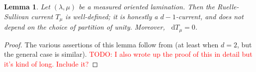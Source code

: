 \documentclass[reqno,11pt]{amsart}
\newcommand{\RR}{\mathbf{R}}
\newcommand*\dif{\mathop{}\!\mathrm{d}}
\newtheorem{lemma}[theorem]{Lemma}
\theoremstyle{definition}
\numberwithin{equation}{section}
\newcommand\todo[1]{\textcolor{red}{TODO: #1}}
\begin{document}
\begin{lemma}
Let $(\lambda, \mu)$ be a measured oriented lamination.
Then the Ruelle-Sullivan current $T_\mu$ is well-defined; it is honestly a $d-1$-current, and does not depend on the choice of partition of unity.
Moreover, $\dif T_\mu = 0$.
\end{lemma}
\begin{proof}
The various assertions of this lemma follow from \cite[Theorem 8.2]{daskalopoulos2020transverse} (at least when $d = 2$, but the general case is similar).
\todo{I also wrote up the proof of this in detail but it's kind of long. Include it?}
\end{proof}

\end{document}
